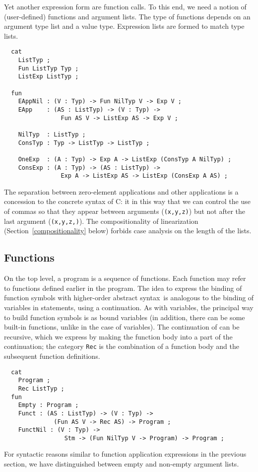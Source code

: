 \documentclass[12pt]{article}
\newcommand{\HOAS}{higher-order abstract syntax}
\begin{document}
Yet another expression form are function calls. To this
end, we need a notion of (user-defined) functions and
argument lists. The type of functions depends on an
argument type list and a value type. Expression lists
are formed to match type lists.
\begin{verbatim}
  cat
    ListTyp ;
    Fun ListTyp Typ ;
    ListExp ListTyp ;

  fun
    EAppNil : (V : Typ) -> Fun NilTyp V -> Exp V ;
    EApp    : (AS : ListTyp) -> (V : Typ) -> 
                Fun AS V -> ListExp AS -> Exp V ;

    NilTyp  : ListTyp ;
    ConsTyp : Typ -> ListTyp -> ListTyp ;

    OneExp  : (A : Typ) -> Exp A -> ListExp (ConsTyp A NilTyp) ;
    ConsExp : (A : Typ) -> (AS : ListTyp) -> 
                Exp A -> ListExp AS -> ListExp (ConsExp A AS) ;
\end{verbatim}
The separation between zero-element applications and other
applications is a concession to the concrete syntax of C:
it in this way that we can control the use of commas so that
they appear between arguments (\texttt{(x,y,z)}) but not
after the last argument (\texttt{(x,y,z,)}).
The compositionality of linearization (Section~\ref{compositionality} below)
forbids case analysis on the length of the lists.


\subsection{Functions}

On the top level, a program is a sequence of functions.
Each function may refer to functions defined earlier
in the program. The idea to express the binding of
function symbols with \HOAS\ is analogous to the binding
of variables in statements, using a continuation.
As with variables, the principal way to build function symbols is as
bound variables (in addition, there can be some
built-in functions, unlike in the case of variables).
The continuation of can be recursive, which we express by
making the function body into a part of the continuation;
the category \texttt{Rec} is the combination of a function
body and the subsequent function definitions.
\begin{verbatim}
  cat
    Program ;
    Rec ListTyp ;
  fun
    Empty : Program ;
    Funct : (AS : ListTyp) -> (V : Typ) -> 
              (Fun AS V -> Rec AS) -> Program ;
    FunctNil : (V : Typ) -> 
                 Stm -> (Fun NilTyp V -> Program) -> Program ;
\end{verbatim}
For syntactic reasons similar to function application
expressions in the previous section, we have distinguished between
empty and non-empty argument lists.
\end{document}
